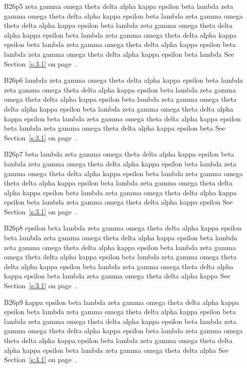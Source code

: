 B26p5 zeta gamma omega theta delta alpha kappa epsilon beta lambda zeta gamma omega theta delta alpha kappa epsilon beta lambda zeta gamma omega theta delta alpha kappa epsilon beta lambda zeta gamma omega theta delta alpha kappa epsilon beta lambda zeta gamma omega theta delta alpha kappa epsilon beta lambda zeta gamma omega theta delta alpha kappa epsilon beta lambda zeta gamma omega theta delta alpha kappa epsilon beta lambda See Section~\ref{s:3.1} on page~\pageref{s:3.1}.

B26p6 lambda zeta gamma omega theta delta alpha kappa epsilon beta lambda zeta gamma omega theta delta alpha kappa epsilon beta lambda zeta gamma omega theta delta alpha kappa epsilon beta lambda zeta gamma omega theta delta alpha kappa epsilon beta lambda zeta gamma omega theta delta alpha kappa epsilon beta lambda zeta gamma omega theta delta alpha kappa epsilon beta lambda zeta gamma omega theta delta alpha kappa epsilon beta See Section~\ref{s:3.1} on page~\pageref{s:3.1}.

B26p7 beta lambda zeta gamma omega theta delta alpha kappa epsilon beta lambda zeta gamma omega theta delta alpha kappa epsilon beta lambda zeta gamma omega theta delta alpha kappa epsilon beta lambda zeta gamma omega theta delta alpha kappa epsilon beta lambda zeta gamma omega theta delta alpha kappa epsilon beta lambda zeta gamma omega theta delta alpha kappa epsilon beta lambda zeta gamma omega theta delta alpha kappa epsilon See Section~\ref{s:3.1} on page~\pageref{s:3.1}.

B26p8 epsilon beta lambda zeta gamma omega theta delta alpha kappa epsilon beta lambda zeta gamma omega theta delta alpha kappa epsilon beta lambda zeta gamma omega theta delta alpha kappa epsilon beta lambda zeta gamma omega theta delta alpha kappa epsilon beta lambda zeta gamma omega theta delta alpha kappa epsilon beta lambda zeta gamma omega theta delta alpha kappa epsilon beta lambda zeta gamma omega theta delta alpha kappa See Section~\ref{s:3.1} on page~\pageref{s:3.1}.

B26p9 kappa epsilon beta lambda zeta gamma omega theta delta alpha kappa epsilon beta lambda zeta gamma omega theta delta alpha kappa epsilon beta lambda zeta gamma omega theta delta alpha kappa epsilon beta lambda zeta gamma omega theta delta alpha kappa epsilon beta lambda zeta gamma omega theta delta alpha kappa epsilon beta lambda zeta gamma omega theta delta alpha kappa epsilon beta lambda zeta gamma omega theta delta alpha See Section~\ref{s:3.1} on page~\pageref{s:3.1}.

